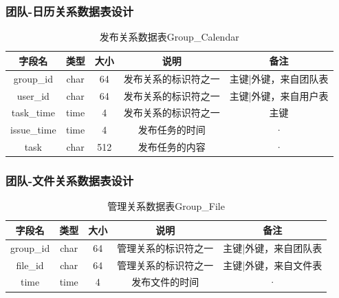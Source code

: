 \subsubsection{团队-日历关系数据表设计}
\begin{table}[htbp]
\centering
\caption{发布关系数据表Group\_Calendar} \label{tab:order-database}
\begin{tabular}{|c|c|c|c|c|}
    \hline
    字段名 & 类型 & 大小 & 说明 & 备注 \\
    \hline
    group\_id & char & 64 & 发布关系的标识符之一 & 主键|外键，来自团队表
    \\
    \hline
    user\_id & char & 64 & 发布关系的标识符之一 & 主键|外键，来自用户表
    \\
    \hline
    task\_time & time & 4 & 发布关系的标识符之一 & 主键\\
    \hline
    issue\_time & time & 4 & 发布任务的时间 & · \\
    \hline
    task & char & 512 & 发布任务的内容 & · \\  
    \hline
\end{tabular}
\end{table}
\subsubsection{团队-文件关系数据表设计}
\begin{table}[htbp]
\centering
\caption{管理关系数据表Group\_File} \label{tab:order-database}
\begin{tabular}{|c|c|c|c|c|}
    \hline
    字段名 & 类型 & 大小 & 说明 & 备注 \\
    \hline
    group\_id & char & 64 & 管理关系的标识符之一 & 主键|外键，来自团队表
    \\
    \hline
    file\_id & char & 64 & 管理关系的标识符之一 & 主键|外键，来自文件表
    \\
    \hline
    time & time & 4 & 发布文件的时间 & · \\ 
    \hline
\end{tabular}
\end{table}
